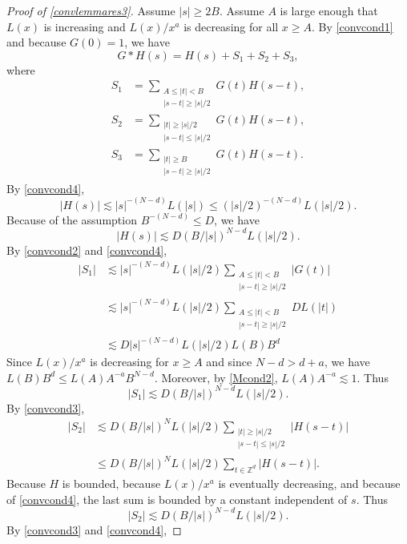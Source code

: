 \documentclass{amsart}
\numberwithin{equation}{section}
\theoremstyle{definition}
\theoremstyle{definition}
\def\ZZ{\mathbb{Z}}
\begin{document}
 

\begin{proof}[Proof of \eqref{convlemmares3}] 
Assume $|s| \geq 2B$. Assume $A$ is large enough that $L(x)$ is increasing and $L(x)/x^a$ is decreasing for all $x \geq A$. 
By \eqref{convcond1} and because $G(0)=1$, we have 
$$
G \ast H(s) = H(s) + S_1 + S_2 + S_3,
$$
where 
\begin{align*}
S_1 &= \sum_{\substack{A \leq |t| < B \\ |s - t| \geq |s|/2}} G(t) H(s-t),  
\\
S_2 &= \sum_{\substack{|t| \geq |s|/2 \\ |s - t| \leq |s|/2}} G(t) H(s-t), \\
S_3 &= \sum_{\substack{|t| \geq B \\ |s - t| \geq |s|/2}} G(t) H(s-t). 
\end{align*}
By \eqref{convcond4}, 
$$
|H(s)| \lesssim |s|^{-(N-d)} L(|s|) \leq (|s|/2)^{-(N-d)} L(|s|/2). 
$$
%
Because of the assumption $B^{-(N-d)} \leq D$, we have 
$$
|H(s)| \lesssim D (B/|s|)^{N-d} L(|s|/2). 
$$
%
By \eqref{convcond2} and \eqref{convcond4}, 
\begin{align*}
|S_1| 
&\lesssim |s|^{-(N-d)}L(|s|/2) \sum_{\substack{A \leq |t| < B \\ |s - t| \geq |s|/2}} |G(t)|
\\
&\lesssim |s|^{-(N-d)}L(|s|/2) 
\sum_{\substack{A \leq |t| < B \\ |s - t| \geq |s|/2}} DL(|t|) 
\\
&\lesssim 
D |s|^{-(N-d)} L(|s|/2) L(B) B^d
\end{align*}
Since $L(x)/x^a$ is decreasing for $x \geq A$ and since $N-d>d+a$, we have 
$L(B) B^d \leq L(A) A^{-a} B^{N-d}$. 
Moreover, by 
\eqref{Mcond2}, $L(A) A^{-a} \lesssim 1$.
Thus 
$$
|S_1| \lesssim  D (B/|s|)^{N-d} L(|s|/2).
$$
By \eqref{convcond3},  
\begin{align*}
|S_2| &\lesssim D(B/|s|)^N L(|s|/2)
\sum_{\substack{|t| \geq |s|/2 \\ |s - t| \leq |s|/2}}  |H(s-t)| 
\\
&\leq 
D(B/|s|)^N L(|s|/2) \sum_{t \in \ZZ^d}  |H(s-t)|.
\end{align*}
Because $H$ is bounded, because $L(x)/x^a$ is eventually decreasing, and because of \eqref{convcond4}, the last sum is bounded by a constant independent of $s$. 
Thus 
$$
|S_2| \lesssim D (B/|s|)^{N-d} L(|s|/2). 
$$
By \eqref{convcond3} and \eqref{convcond4}, 

\end{proof}
\end{document}

